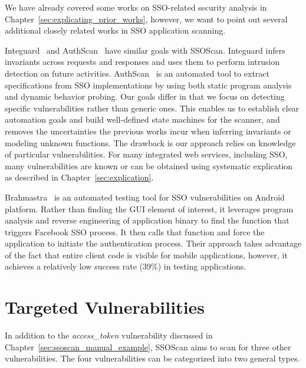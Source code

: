  We have already covered some works on SSO-related security analysis in Chapter~\ref{sec:explicating_prior_works}, however, we want to point out several additional closely related works in SSO application scanning.

Integuard~\cite{Integuard} and AuthScan~\cite{AuthScan} have similar goals with SSOScan.  Integuard infers invariants across requests and responses and uses them to perform intrusion detection on future activities.  AuthScan~\cite{AuthScan} is an automated tool to extract specifications from SSO implementations by using both static program analysis and dynamic behavior probing.  Our goals differ in that we focus on detecting specific vulnerabilities rather than generic ones.  This enables us to establish clear automation goals and build well-defined state machines for the scanner, and removes the uncertainties the previous works incur when inferring invariants or modeling unknown functions.  The drawback is our approach relies on knowledge of particular vulnerabilities.  For many integrated web services, including SSO, many vulnerabilities are known or can be obtained using systematic explication as described in Chapter~\ref{sec:explication}.

\renewcommand{\thefootnote}{$\star$} 


Brahmastra\footnotemark[1]~\cite{184453} is an automated testing tool for SSO vulnerabilities on Android platform.  Rather than finding the GUI element of interest, it leverages program analysis and reverse engineering of application binary to find the function that triggers Facebook SSO process.  It then calls that function and force the application to initiate the authentication process.  Their approach takes advantage of the fact that entire client code is visible for mobile applications, however, it achieves a relatively low success rate (39\%) in testing applications.

\renewcommand{\thefootnote}{\arabic{footnote}}

\section{Targeted Vulnerabilities}
\label{sec:ssoscan_vuls}

In addition to the \emph{access\_token} vulnerability discussed in Chapter~\ref{sec:ssoscan_manual_example}, SSOScan aims to scan for three other vulnerabilities.  The four vulnerabilities can be categorized into two general types.

